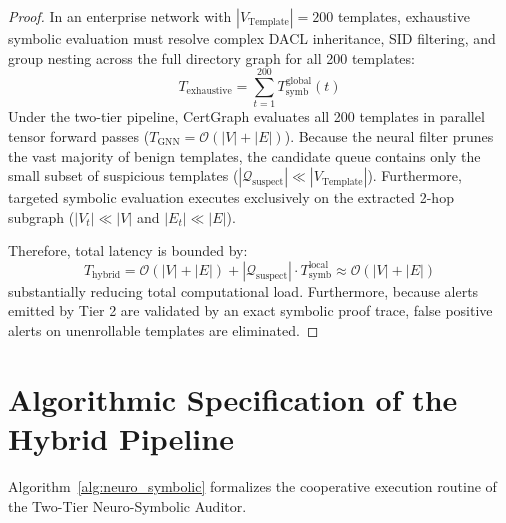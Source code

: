 \begin{proof}
In an enterprise network with $|V_{\text{Template}}| = 200$ templates, exhaustive symbolic evaluation must resolve complex DACL inheritance, SID filtering, and group nesting across the full directory graph for all 200 templates:
\begin{equation}
T_{\text{exhaustive}} = \sum_{t=1}^{200} T_{\text{symb}}^{\text{global}}(t)
\end{equation}
Under the two-tier pipeline, CertGraph evaluates all 200 templates in parallel tensor forward passes ($T_{\text{GNN}} = \mathcal{O}(|V| + |E|)$). Because the neural filter prunes the vast majority of benign templates, the candidate queue contains only the small subset of suspicious templates ($|\mathcal{Q}_{\text{suspect}}| \ll |V_{\text{Template}}|$). Furthermore, targeted symbolic evaluation executes exclusively on the extracted 2-hop subgraph ($|V_t| \ll |V|$ and $|E_t| \ll |E|$).

Therefore, total latency is bounded by:
\begin{equation}
T_{\text{hybrid}} = \mathcal{O}(|V| + |E|) + |\mathcal{Q}_{\text{suspect}}| \cdot T_{\text{symb}}^{\text{local}} \approx \mathcal{O}(|V| + |E|)
\end{equation}
substantially reducing total computational load. Furthermore, because alerts emitted by Tier 2 are validated by an exact symbolic proof trace, false positive alerts on unenrollable templates are eliminated.
\end{proof}

\section{Algorithmic Specification of the Hybrid Pipeline}
Algorithm~\ref{alg:neuro_symbolic} formalizes the cooperative execution routine of the Two-Tier Neuro-Symbolic Auditor.

